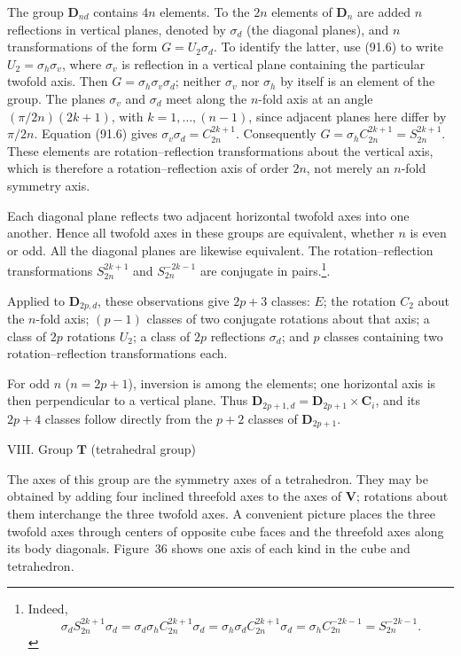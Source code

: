 The group $\boldsymbol{D}_{nd}$ contains $4n$ elements. To the $2n$ elements of $\boldsymbol{D}_n$ are added $n$ reflections in vertical planes, denoted by $\sigma_d$ (the diagonal planes), and $n$ transformations of the form $G=U_2\sigma_d$. To identify the latter, use (91.6) to write $U_2=\sigma_h\sigma_v$, where $\sigma_v$ is reflection in a vertical plane containing the particular twofold axis. Then $G=\sigma_h\sigma_v\sigma_d$; neither $\sigma_v$ nor $\sigma_h$ by itself is an element of the group. The planes $\sigma_v$ and $\sigma_d$ meet along the $n$-fold axis at an angle $(\pi/2n)(2k+1)$, with $k=1,\ldots,(n-1)$, since adjacent planes here differ by $\pi/2n$. Equation (91.6) gives $\sigma_v\sigma_d=C_{2n}^{2k+1}$. Consequently $G=\sigma_hC_{2n}^{2k+1}=S_{2n}^{2k+1}$. These elements are rotation--reflection transformations about the vertical axis, which is therefore a rotation--reflection axis of order $2n$, not merely an $n$-fold symmetry axis.

Each diagonal plane reflects two adjacent horizontal twofold axes into one another. Hence all twofold axes in these groups are equivalent, whether $n$ is even or odd. All the diagonal planes are likewise equivalent. The rotation--reflection transformations $S_{2n}^{2k+1}$ and $S_{2n}^{-2k-1}$ are conjugate in pairs.\footnote{Indeed,
\[
\sigma_dS_{2n}^{2k+1}\sigma_d=\sigma_d\sigma_hC_{2n}^{2k+1}\sigma_d=\sigma_h\sigma_dC_{2n}^{2k+1}\sigma_d=\sigma_hC_{2n}^{-2k-1}=S_{2n}^{-2k-1}.
\]}.

Applied to $\boldsymbol{D}_{2p,d}$, these observations give $2p+3$ classes: $E$; the rotation $C_2$ about the $n$-fold axis; $(p-1)$ classes of two conjugate rotations about that axis; a class of $2p$ rotations $U_2$; a class of $2p$ reflections $\sigma_d$; and $p$ classes containing two rotation--reflection transformations each.

For odd $n$ ($n=2p+1$), inversion is among the elements; one horizontal axis is then perpendicular to a vertical plane. Thus $\boldsymbol{D}_{2p+1,d}=\boldsymbol{D}_{2p+1}\times\boldsymbol{C}_i$, and its $2p+4$ classes follow directly from the $p+2$ classes of $\boldsymbol{D}_{2p+1}$.

\medskip
\noindent VIII. Group $\boldsymbol{T}$ (tetrahedral group)

The axes of this group are the symmetry axes of a tetrahedron. They may be obtained by adding four inclined threefold axes to the axes of $\boldsymbol{V}$; rotations about them interchange the three twofold axes. A convenient picture places the three twofold axes through centers of opposite cube faces and the threefold axes along its body diagonals. Figure~36 shows one axis of each kind in the cube and tetrahedron.


